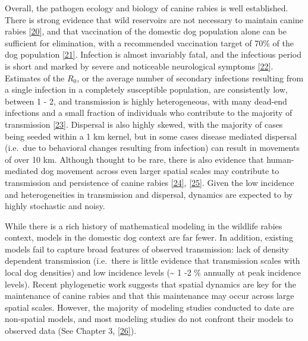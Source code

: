 \documentclass[
  oneside]{book}
\begin{document}
Overall, the pathogen ecology and biology of canine rabies is well established. There is strong evidence that wild reservoirs are not necessary to maintain canine rabies \protect\hyperlink{ref-lembo2010}{{[}20{]}}, and that vaccination of the domestic dog population alone can be sufficient for elimination, with a recommended vaccination target of 70\% of the dog population \protect\hyperlink{ref-delriovilas2017}{{[}21{]}}. Infection is almost invariably fatal, and the infectious period is short and marked by severe and noticeable neurological symptoms \protect\hyperlink{ref-rupprecht2002}{{[}22{]}}. Estimates of the \(R_{0}\), or the average number of secondary infections resulting from a single infection in a completely susceptible population, are consistently low, between 1 - 2, and transmission is highly heterogeneous, with many dead-end infections and a small fraction of individuals who contribute to the majority of transmission \protect\hyperlink{ref-hampson2009}{{[}23{]}}. Dispersal is also highly skewed, with the majority of cases being seeded within a 1 km kernel, but in some cases disease mediated dispersal (i.e.~due to behavioral changes resulting from infection) can result in movements of over 10 km. Although thought to be rare, there is also evidence that human-mediated dog movement across even larger spatial scales may contribute to transmission and persistence of canine rabies \protect\hyperlink{ref-talbi2010}{{[}24{]}}, \protect\hyperlink{ref-brunker2015}{{[}25{]}}. Given the low incidence and heterogeneities in transmission and dispersal, dynamics are expected to by highly stochastic and noisy.

While there is a rich history of mathematical modeling in the wildlife rabies context, models in the domestic dog context are far fewer. In addition, existing models fail to capture broad features of observed transmission: lack of density dependent transmission (i.e.~there is little evidence that transmission scales with local dog densities) and low incidence levels (\textasciitilde{} 1 -2 \% annually at peak incidence levels). Recent phylogenetic work suggests that spatial dynamics are key for the maintenance of canine rabies and that this maintenance may occur across large spatial scales. However, the majority of modeling studies conducted to date are non-spatial models, and most modeling studies do not confront their models to observed data (See Chapter 3, \protect\hyperlink{ref-rajeev2020modeling}{{[}26{]}}).
\end{document}
